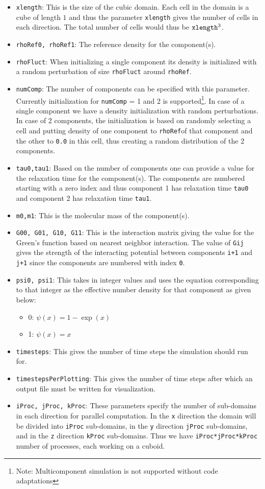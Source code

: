 \documentclass[11pt]{article}
\begin{document}
\begin{itemize}
	\item \verb|xlength|: This is the size of the cubic domain. Each cell in the domain is a cube of length $1$ and thus the parameter \verb|xlength| gives the number of cells in each direction. The total number of cells would thus be $\verb|xlength|^3$.
    \item \verb|rhoRef0, rhoRef1|:  The reference density for the component(s).
    \item \verb|rhoFluct|: When initializing a single component its density is initialized with a random perturbation of size \verb|rhoFluct| around \verb|rhoRef|.
    \item \verb|numComp|: The number of components can be specified with this parameter. Currently initialization for \verb|numComp| = 1 and 2 is supported\footnote{Note: Multicomponent simulation is not supported without code adaptations}. In case of a single component we have a density initialization with random perturbations. In case of 2 components, the initialization is based on randomly selecting a cell and putting density of one component to \verb|rhoRef|of that component and the other to \verb|0.0| in this cell, thus creating a random distribution of the 2 components.
	\item \verb|tau0,tau1|: Based on the number of components one can provide a value for the relaxation time for the component(s). The components are numbered starting with a zero index and thus component 1 has relaxation time \verb|tau0| and component 2 has relaxation time \verb|tau1|.
	\item \verb|m0,m1|: This is the molecular mass of the component(s).
	\item \verb|G00, G01, G10, G11|: This is the interaction matrix giving the value for the Green's function based on nearest neighbor interaction. The value of \verb|Gij| gives the strength of the interacting potential between components \verb|i+1| and \verb|j+1| since the components are numbered with index \verb|0|.
	\item \verb|psi0, psi1|: This takes in integer values and uses the equation corresponding to that integer as the effective number density for that component as given below:
	\begin{itemize}
		\item 0: $\psi(x) = 1-\exp(x)$
		\item 1: $\psi(x) = x$
	\end{itemize}
	\item \verb|timesteps|: This gives the number of time steps the simulation should run for.
	\item \verb|timestepsPerPlotting|: This gives the number of time steps after which an output file must be written for visualization.
	\item \verb|iProc, jProc, kProc|: These parameters specify the number of sub-domains in each direction for parallel computation. In the \verb|x| direction the domain will be divided into \verb|iProc| sub-domains, in the \verb|y| direction \verb|jProc| sub-domains, and in the \verb|z| direction \verb|kProc| sub-domains. Thus we have \verb|iProc*jProc*kProc| number of processes, each working on a cuboid.
\end{itemize}
\end{document}
